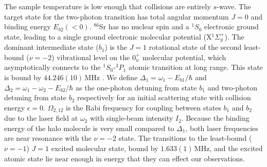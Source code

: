 

The sample temperature is low enough that collisions are entirely $s$-wave. The target state for the two-photon transition has total angular momentum $J=0$ and binding energy $E_{b2}(<0)$. $^{86}$Sr has no nuclear spin and a $^1S_0$ electronic ground state, leading to a single ground electronic molecular potential (X$^1\Sigma_g^+$). The dominant intermediate state ($b_1$) is the $J=1$ rotational state of the second least-bound ($\nu=-2$) vibrational level on the $0^+_u$ molecular potential, which asymptotically connects to the $^1S_0$-$^3P_1$ atomic transition at long range. This state is bound by $44.246(10)$\,MHz \cite{bmc14}. We define $\Delta_1=\omega_1-E_{b1}/\hbar$ and $\Delta_2=\omega_1-\omega_2-E_{b2}/\hbar$ as the one-photon detuning from state $b_1$ and two-photon detuning from state $b_2$ respectively for an initial scattering state with collision energy $\epsilon=0$.
$\Omega_{2,12}$ is the Rabi frequency for coupling between states $b_1$ and $b_2$ due to the laser field at $\omega_2$ with single-beam intensity $I_2$.
Because the binding energy of the halo molecule is very small compared to $\Delta_1$, both laser frequencies are near resonance with the $\nu=-2$ state.  The transitions to the least-bound ($\nu=-1$) $J=1$ excited molecular state, bound by $1.633(1)$\,MHz, and the excited atomic state lie near enough in energy that they can effect our observations.




